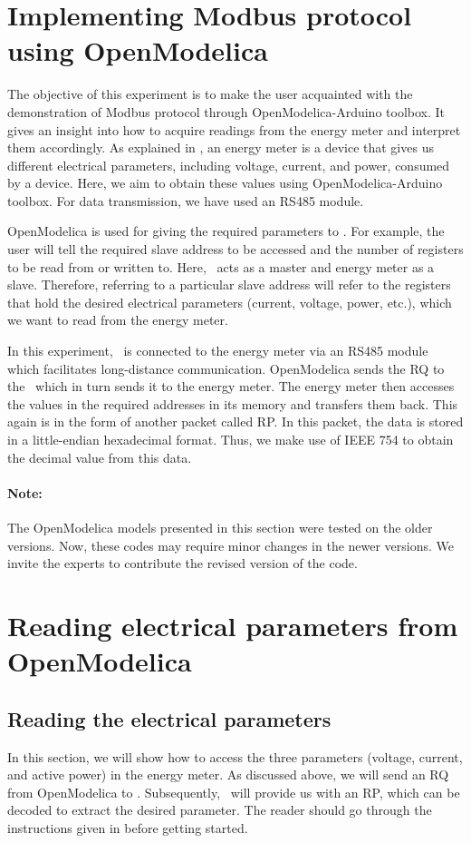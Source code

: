 
\section{Implementing Modbus protocol using OpenModelica}
The objective of this experiment is to make the user acquainted with
the demonstration of Modbus protocol through OpenModelica-Arduino toolbox.
It gives an insight into how to acquire readings from the energy meter and interpret them accordingly. As explained in ,
an energy meter is a device that gives us different electrical parameters, including voltage, current, and power, consumed by a device. Here, we aim to obtain these values using OpenModelica-Arduino toolbox. For data transmission, we have used an RS485 module.

OpenModelica is used for giving the required parameters to \arduino. For
example, the user will tell the required slave address to be accessed
and the number of registers to be read from or written to. Here,
\arduino\ acts as a master and energy meter as a slave. Therefore,
referring to a particular slave address will refer to the registers
that hold the desired electrical parameters (current, voltage, power, etc.), which we want to read from the energy meter.

In this experiment, \arduino\ is connected to the energy meter via an RS485 module which facilitates long-distance communication.
OpenModelica sends the RQ to the \arduino\, which in turn sends it to the
energy meter. The energy meter then accesses the values in the
required addresses in its memory and transfers them back. This again
is in the form of another packet called RP. In this packet, the data is stored in a little-endian hexadecimal format. Thus, we make use of IEEE 754 to obtain the decimal value from this data.

\paragraph{Note: } The OpenModelica models presented in this section were tested on the older versions. Now, these codes may require minor changes in
the newer versions. We invite the experts to contribute the revised version of the code.


\section{Reading electrical parameters from OpenModelica}
\subsection{Reading the electrical parameters}
In this section, we will show how to access the three parameters (voltage, current, and active power) in the energy meter. As discussed above, we will send an RQ from OpenModelica to \arduino. Subsequently, \arduino\ will provide us with an RP, which can be decoded to extract the desired parameter. The reader should go through the instructions given in  before getting started.

